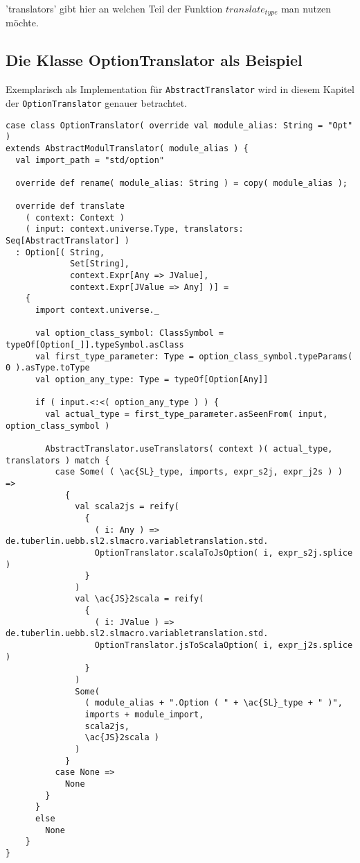 \documentclass[12pt,a4paper]{report}
\begin{document}
'translators' gibt hier an welchen Teil der Funktion $translate_{type}$ man nutzen möchte.

\subsection{Die Klasse OptionTranslator als Beispiel}

Exemplarisch als Implementation für \lstinline!AbstractTranslator! wird in diesem Kapitel der \lstinline!OptionTranslator! genauer betrachtet.

\begin{lstlisting}[caption=Source Code von OptionTranslator, label=lst:source option translator]
case class OptionTranslator( override val module_alias: String = "Opt" ) 
extends AbstractModulTranslator( module_alias ) {
  val import_path = "std/option"

  override def rename( module_alias: String ) = copy( module_alias );
  
  override def translate
    ( context: Context )
    ( input: context.universe.Type, translators: Seq[AbstractTranslator] )
  : Option[( String, 
             Set[String], 
             context.Expr[Any => JValue], 
             context.Expr[JValue => Any] )] =
    {
      import context.universe._

      val option_class_symbol: ClassSymbol = typeOf[Option[_]].typeSymbol.asClass
      val first_type_parameter: Type = option_class_symbol.typeParams( 0 ).asType.toType
      val option_any_type: Type = typeOf[Option[Any]]

      if ( input.<:<( option_any_type ) ) {
        val actual_type = first_type_parameter.asSeenFrom( input, option_class_symbol )

        AbstractTranslator.useTranslators( context )( actual_type, translators ) match {
          case Some( ( \ac{SL}_type, imports, expr_s2j, expr_j2s ) ) =>
            {
              val scala2js = reify( 
                { 
                  ( i: Any ) => de.tuberlin.uebb.sl2.slmacro.variabletranslation.std.
                  OptionTranslator.scalaToJsOption( i, expr_s2j.splice ) 
                } 
              )
              val \ac{JS}2scala = reify( 
                { 
                  ( i: JValue ) => de.tuberlin.uebb.sl2.slmacro.variabletranslation.std.
                  OptionTranslator.jsToScalaOption( i, expr_j2s.splice ) 
                } 
              )
              Some( 
                ( module_alias + ".Option ( " + \ac{SL}_type + " )", 
                imports + module_import, 
                scala2js, 
                \ac{JS}2scala ) 
              )
            }
          case None =>
            None
        }
      }
      else
        None
    }
}


\end{lstlisting}
\end{document}
